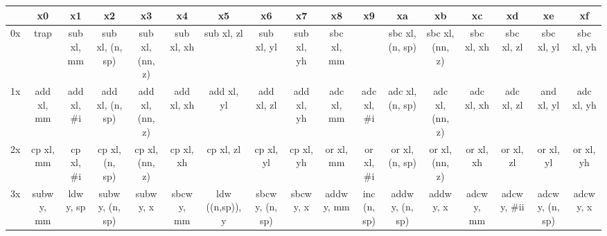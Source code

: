 \documentclass{book}
\begin{document}
\begin{table}
\centering
\begin{adjustbox}{width=1.2\textwidth}
\begin{tabular}{l||c|c|c|c|c|c|c|c|c|c|c|c|c|c|c|c}
 &x0 & x1 & x2 & x3 & x4 & x5 & x6 & x7 & x8 & x9 & xa & xb & xc & xd & xe & xf \\
\hline\hline
0x & \cellcolor{DarkSeaGreen1} trap & \cellcolor{LemonChiffon1} sub xl, mm & \cellcolor{LemonChiffon1} sub xl, (n, sp) & \cellcolor{LemonChiffon1} sub xl, (nn, z) & \cellcolor{LemonChiffon1} sub xl, xh & \cellcolor{LemonChiffon1} sub xl, zl & \cellcolor{LemonChiffon1} sub xl, yl & \cellcolor{LemonChiffon1} sub xl, yh & \cellcolor{LemonChiffon1} sbc xl, mm & \cellcolor{white}  & \cellcolor{LemonChiffon1} sbc xl, (n, sp) & \cellcolor{LemonChiffon1} sbc xl, (nn, z) & \cellcolor{LemonChiffon1} sbc xl, xh & \cellcolor{LemonChiffon1} sbc xl, zl & \cellcolor{LemonChiffon1} sbc xl, yl & \cellcolor{LemonChiffon1} sbc xl, yh \\
\hline
1x & \cellcolor{DarkSeaGreen1} add xl, mm & \cellcolor{DarkSeaGreen1} add xl, \#i & \cellcolor{DarkSeaGreen1} add xl, (n, sp) & \cellcolor{DarkSeaGreen1} add xl, (nn, z) & \cellcolor{DarkSeaGreen1} add xl, xh & \cellcolor{DarkSeaGreen1} add xl, yl & \cellcolor{DarkSeaGreen1} add xl, zl & \cellcolor{DarkSeaGreen1} add xl, yh & \cellcolor{DarkSeaGreen1} adc xl, mm & \cellcolor{DarkSeaGreen1} adc xl, \#i & \cellcolor{DarkSeaGreen1} adc xl, (n, sp) & \cellcolor{DarkSeaGreen1} adc xl, (nn, z) & \cellcolor{DarkSeaGreen1} adc xl, xh & \cellcolor{DarkSeaGreen1} adc xl, zl & \cellcolor{DarkSeaGreen1} and xl, yl & \cellcolor{DarkSeaGreen1} adc xl, yh \\
\hline
2x & \cellcolor{LemonChiffon1} cp xl, mm & \cellcolor{LemonChiffon1} cp xl, \#i & \cellcolor{LemonChiffon1} cp xl, (n, sp) & \cellcolor{LemonChiffon1} cp xl, (nn, z) & \cellcolor{LemonChiffon1} cp xl, xh & \cellcolor{LemonChiffon1} cp xl, zl & \cellcolor{LemonChiffon1} cp xl, yl & \cellcolor{LemonChiffon1} cp xl, yh & \cellcolor{DarkSeaGreen1} or xl, mm & \cellcolor{DarkSeaGreen1} or xl, \#i & \cellcolor{DarkSeaGreen1} or xl, (n, sp) & \cellcolor{DarkSeaGreen1} or xl, (nn, z) & \cellcolor{DarkSeaGreen1} or xl, xh & \cellcolor{DarkSeaGreen1} or xl, zl & \cellcolor{DarkSeaGreen1} or xl, yl & \cellcolor{DarkSeaGreen1} or xl, yh \\
\hline
3x & \cellcolor{Bisque1} subw y, mm & \cellcolor{DarkSeaGreen1} ldw y, sp & \cellcolor{Bisque1} subw y, (n, sp) & \cellcolor{Bisque1} subw y, x & \cellcolor{Bisque1} sbcw y, mm & \cellcolor{Bisque1} ldw ((n,sp)), y & \cellcolor{Bisque1} sbcw y, (n, sp) & \cellcolor{Bisque1} sbcw y, x & \cellcolor{Bisque1} addw y, mm & \cellcolor{DarkSeaGreen1} inc (n, sp) & \cellcolor{Bisque1} addw y, (n, sp) & \cellcolor{Bisque1} addw y, x & \cellcolor{Bisque1} adcw y, mm & \cellcolor{Bisque1} adcw y, \#ii & \cellcolor{Bisque1} adcw y, (n, sp) & \cellcolor{Bisque1} adcw y, x \\

\end{tabular}
\end{adjustbox}
\end{table}
\end{document}
